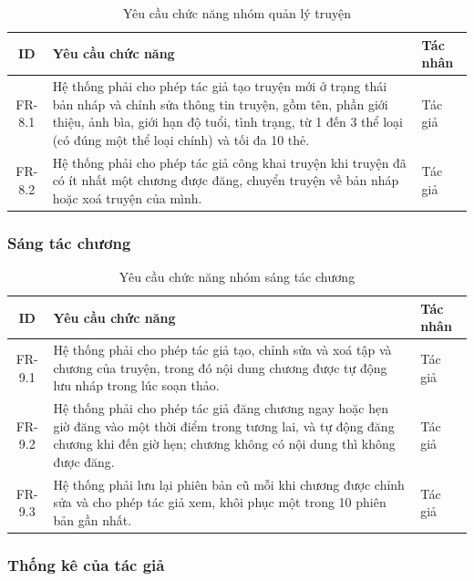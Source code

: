 \begin{table}[H]
\centering
\renewcommand{\arraystretch}{1.3}
\begin{tabularx}{\textwidth}{|c|X|p{3cm}|}
\hline
\textbf{ID} & \textbf{Yêu cầu chức năng} & \textbf{Tác nhân} \\ \hline
FR-8.1 & Hệ thống phải cho phép tác giả tạo truyện mới ở trạng thái bản nháp và chỉnh sửa thông tin truyện, gồm tên, phần giới thiệu, ảnh bìa, giới hạn độ tuổi, tình trạng, từ 1 đến 3 thể loại (có đúng một thể loại chính) và tối đa 10 thẻ. & Tác giả \\ \hline
FR-8.2 & Hệ thống phải cho phép tác giả công khai truyện khi truyện đã có ít nhất một chương được đăng, chuyển truyện về bản nháp hoặc xoá truyện của mình. & Tác giả \\ \hline
\end{tabularx}
\caption{Yêu cầu chức năng nhóm quản lý truyện}
\label{tab:fr-story}
\end{table}

\subsubsection{Sáng tác chương}

\begin{table}[H]
\centering
\renewcommand{\arraystretch}{1.3}
\begin{tabularx}{\textwidth}{|c|X|p{3cm}|}
\hline
\textbf{ID} & \textbf{Yêu cầu chức năng} & \textbf{Tác nhân} \\ \hline
FR-9.1 & Hệ thống phải cho phép tác giả tạo, chỉnh sửa và xoá tập và chương của truyện, trong đó nội dung chương được tự động lưu nháp trong lúc soạn thảo. & Tác giả \\ \hline
FR-9.2 & Hệ thống phải cho phép tác giả đăng chương ngay hoặc hẹn giờ đăng vào một thời điểm trong tương lai, và tự động đăng chương khi đến giờ hẹn; chương không có nội dung thì không được đăng. & Tác giả \\ \hline
FR-9.3 & Hệ thống phải lưu lại phiên bản cũ mỗi khi chương được chỉnh sửa và cho phép tác giả xem, khôi phục một trong 10 phiên bản gần nhất. & Tác giả \\ \hline
\end{tabularx}
\caption{Yêu cầu chức năng nhóm sáng tác chương}
\label{tab:fr-chapter}
\end{table}

\subsubsection{Thống kê của tác giả}

